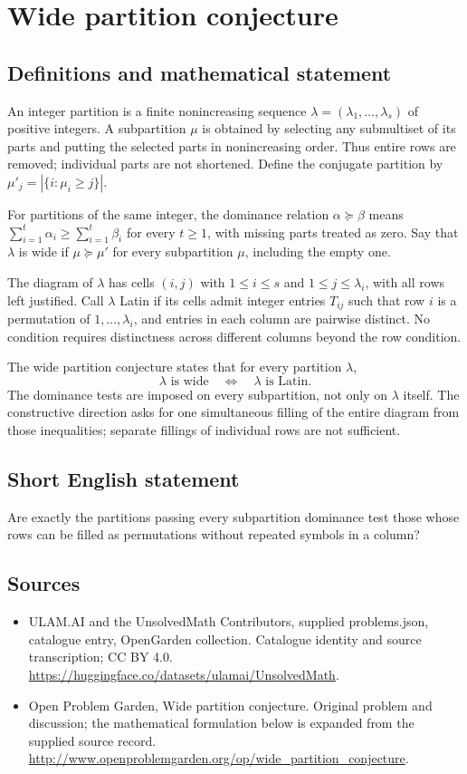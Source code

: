 \documentclass[11pt,a4paper]{article}
\begin{document}
\section*{Wide partition conjecture}\label{statement}

\subsection{Definitions and mathematical statement}
An integer partition is a finite nonincreasing sequence
$\lambda=(\lambda_1,\ldots,\lambda_s)$ of positive integers.
A subpartition $\mu$ is obtained by selecting any submultiset of its parts
and putting the selected parts in nonincreasing order. Thus entire rows
are removed; individual parts are not shortened. Define the conjugate
partition by $\mu'_j=|\{i:\mu_i\ge j\}|$.

For partitions of the same integer, the dominance relation $\alpha\succeq\beta$
means $\sum_{i=1}^t\alpha_i\ge\sum_{i=1}^t\beta_i$ for every $t\ge1$,
with missing parts treated as zero. Say that $\lambda$ is wide if
$\mu\succeq\mu'$ for every subpartition $\mu$, including the empty one.

The diagram of $\lambda$ has cells $(i,j)$ with $1\le i\le s$ and
$1\le j\le\lambda_i$, with all rows left justified. Call $\lambda$ Latin
if its cells admit integer entries $T_{ij}$ such that row $i$ is a
permutation of $1,\ldots,\lambda_i$, and entries in each column are
pairwise distinct. No condition requires distinctness across different
columns beyond the row condition.

The wide partition conjecture states that for every partition $\lambda$,
\[
 \lambda\text{ is wide}\quad\Longleftrightarrow\quad
 \lambda\text{ is Latin}.
\]
The dominance tests are imposed on every subpartition, not only on
$\lambda$ itself. The constructive direction asks for one simultaneous
filling of the entire diagram from those inequalities; separate fillings
of individual rows are not sufficient.
\subsection{Short English statement}
Are exactly the partitions passing every subpartition dominance test those whose rows can be filled as permutations without repeated symbols in a column?
\subsection{Sources}
\begin{itemize}
\item[S1] ULAM.AI and the UnsolvedMath Contributors, supplied problems.json, catalogue entry, OpenGarden collection. Catalogue identity and source transcription; CC BY 4.0.
\url{https://huggingface.co/datasets/ulamai/UnsolvedMath}.
\item[S2] Open Problem Garden, Wide partition conjecture. Original problem and discussion; the mathematical formulation below is expanded from the supplied source record.
\url{http://www.openproblemgarden.org/op/wide_partition_conjecture}.
\end{itemize}
\end{document}

